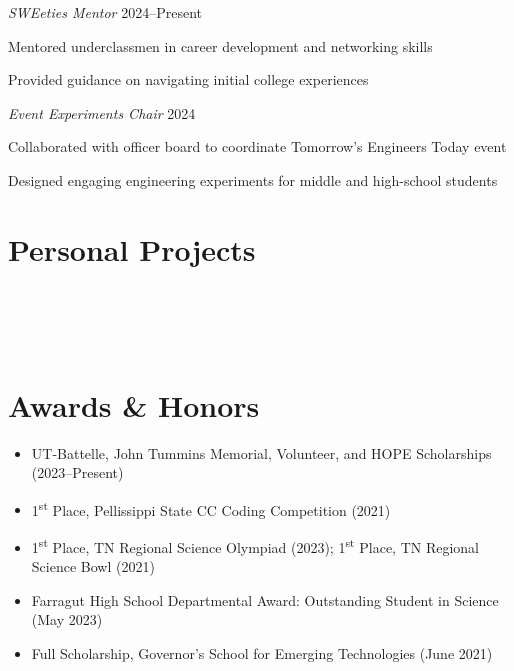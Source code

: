 \documentclass[11pt,a4paper]{article}
\begin{document}
\textit{SWEeties Mentor} \vspace{-6pt} \hfill 2024--Present
\begin{itemize}[leftmargin=*, topsep=0pt, itemsep=1pt, partopsep=0pt, parsep=0pt]
  {\small
  \item Mentored underclassmen in career development and networking skills
  \item Provided guidance on navigating initial college experiences
  }
\end{itemize}
\vspace{-5pt}

\textit{Event Experiments Chair} \vspace{-6pt} \hfill 2024
\begin{itemize}[leftmargin=*, topsep=0pt, itemsep=1pt, partopsep=0pt, parsep=0pt]
  {\small
  \item Collaborated with officer board to coordinate Tomorrow's Engineers Today event
  \item Designed engaging engineering experiments for middle and high-school students
  }
\end{itemize}
\vspace{-4pt}

\section*{Personal Projects}
 \\
 \\
 \\
\vspace{-15pt}


\section*{Awards \& Honors}
\begin{itemize}[leftmargin=*, topsep=0pt, itemsep=2pt, parsep=0pt]
  \item UT-Battelle, John Tummins Memorial, Volunteer, and HOPE Scholarships (2023–Present)
  \item 1\textsuperscript{st} Place, Pellissippi State CC Coding Competition (2021)
  \item 1\textsuperscript{st} Place, TN Regional Science Olympiad (2023); 1\textsuperscript{st} Place, TN Regional Science Bowl (2021)
  \item Farragut High School Departmental Award: Outstanding Student in Science (May 2023)
  \item Full Scholarship, Governor’s School for Emerging Technologies (June 2021) 
\end{itemize}
\end{document}
